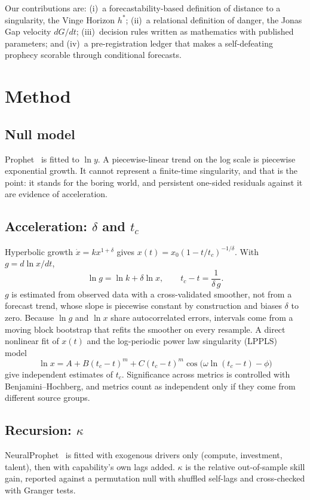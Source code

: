 \documentclass[11pt]{article}
\begin{document}
Our contributions are: (i)~a forecastability-based definition of distance to a
singularity, the Vinge Horizon $h^*$; (ii)~a relational definition of danger,
the Jonas Gap velocity $dG/dt$; (iii)~decision rules written as mathematics with
published parameters; and (iv)~a pre-registration ledger that makes a
self-defeating prophecy scorable through conditional forecasts.

\section{Method}

\subsection{Null model}
Prophet~\cite{taylor2018} is fitted to $\ln y$. A piecewise-linear trend on the
log scale is piecewise exponential growth. It cannot represent a finite-time
singularity, and that is the point: it stands for the boring world, and
persistent one-sided residuals against it are evidence of acceleration.

\subsection{Acceleration: $\delta$ and $t_c$}
Hyperbolic growth $\dot x = k x^{1+\delta}$ gives
$x(t)=x_0(1-t/t_c)^{-1/\delta}$. With $g=d\ln x/dt$,
\begin{equation}
\ln g = \ln k + \delta \ln x, \qquad t_c - t = \frac{1}{\delta\, g}.
\end{equation}
$g$ is estimated from observed data with a cross-validated smoother, not from a
forecast trend, whose slope is piecewise constant by construction and biases
$\delta$ to zero. Because $\ln g$ and $\ln x$ share autocorrelated errors,
intervals come from a moving block bootstrap that refits the smoother on every
resample. A direct nonlinear fit of $x(t)$ and the log-periodic power law
singularity (LPPLS) model~\cite{sornette2003}
\begin{equation}
\ln x = A + B(t_c-t)^m + C(t_c-t)^m\cos\!\big(\omega\ln(t_c-t)-\phi\big)
\end{equation}
give independent estimates of $t_c$. Significance across metrics is controlled
with Benjamini--Hochberg, and metrics count as independent only if they come
from different source groups.

\subsection{Recursion: $\kappa$}
NeuralProphet~\cite{triebe2021} is fitted with exogenous drivers only (compute,
investment, talent), then with capability's own lags added. $\kappa$ is the
relative out-of-sample skill gain, reported against a permutation null with
shuffled self-lags and cross-checked with Granger tests.
\end{document}
